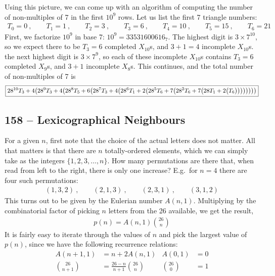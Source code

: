 \documentclass{article}
\begin{document}
Using this picture, we can come up with an algorithm of computing the number of non-multiples of 7 in the first $10^9$ rows.
Let us list the first 7 triangle numbers:
\begin{align*}
	T_0 = 0~, \qquad T_1 = 1~, \qquad T_2 = 3 ~, \qquad T_3 = 6 ~,\qquad T_4 = 10 ~,\qquad T_5 = 15 ~, \qquad T_6 = 21
\end{align*}
First, we factorize $10^9$ in base 7: $10^9 = 33531600616_7$.
The highest digit is $3 \times 7^{10}$, so we expect there to be $T_3 = 6$ completed $X_{10}$s, and $3+1 = 4$ incomplete $X_{10}$s.
the next highest digit is $3 \times 7^9$, so each of these incomplete $X_{10}$s contains $T_3 = 6$ completed $X_9$s, and $3+1$ incomplete $X_8$s.
This continues, and the total number of non-multiples of 7 is
\begin{align*}
	\boxed{ 28^{10} T_3 + 4 \qty( 28^9 T_3 + 4 \qty( 28^8 T_5 + 6 \qty( 28^7 T_3 + 4 \qty( 28^6 T_1 + 2 \qty( 28^5 T_6 + 7 \qty( 28^2 T_6 + 7 \qty\big( 28 T_1 + 2 \qty\big( T_6 )))))))) }
\end{align*}


\subsection*{158 -- Lexicographical Neighbours}
For a given $n$, first note that the choice of the actual letters does not matter.
All that matters is that there are $n$ totally-ordered elements, which we can simply take as the integers $\{1, 2, 3, \dotsc, n\}$.
How many permutations are there that, when read from left to the right, there is only one increase?
E.g.~for $n=4$ there are four such permutations:
\begin{align*}
	(1, 3, 2) ~, \qquad (2, 1, 3) ~, \qquad (2, 3, 1) ~, \qquad (3, 1, 2)
\end{align*}
This turns out to be given by the Eulerian number $A(n, 1)$.
Multiplying by the combinatorial factor of picking $n$ letters from the 26 available, we get the result,
\begin{align*}
	p(n) = A(n, 1) \binom{26}{n} 
\end{align*}
It is fairly easy to iterate through the values of $n$ and pick the largest value of $p(n)$, since we have the following recurrence relations:
\begin{align*}
	A(n+1, 1) &= n + 2 A(n, 1) & A(0, 1) &= 0 \\
	\binom{26}{n + 1} &= \frac{26 - n}{n + 1} \binom{26}{n} & \binom{26}{0} &= 1
\end{align*}
\end{document}

